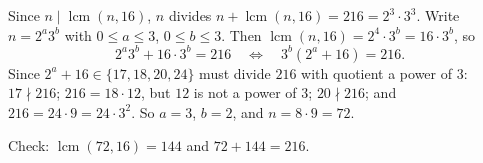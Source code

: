 Since $n\mid\operatorname{lcm}(n,16)$, $n$ divides $n+\operatorname{lcm}(n,16)=216=2^3\cdot3^3$. Write $n=2^a3^b$ with $0\le a\le3$, $0\le b\le3$. Then $\operatorname{lcm}(n,16)=2^4\cdot3^b=16\cdot3^b$, so
\[
2^a3^b+16\cdot3^b=216\quad\Longleftrightarrow\quad3^b\left(2^a+16\right)=216 .
\]
Since $2^a+16\in\{17,18,20,24\}$ must divide $216$ with quotient a power of $3$: $17\nmid216$; $216=18\cdot12$, but $12$ is not a power of $3$; $20\nmid216$; and $216=24\cdot9=24\cdot3^2$. So $a=3$, $b=2$, and $n=8\cdot9=\boxed{72}$.

Check: $\operatorname{lcm}(72,16)=144$ and $72+144=216$.
